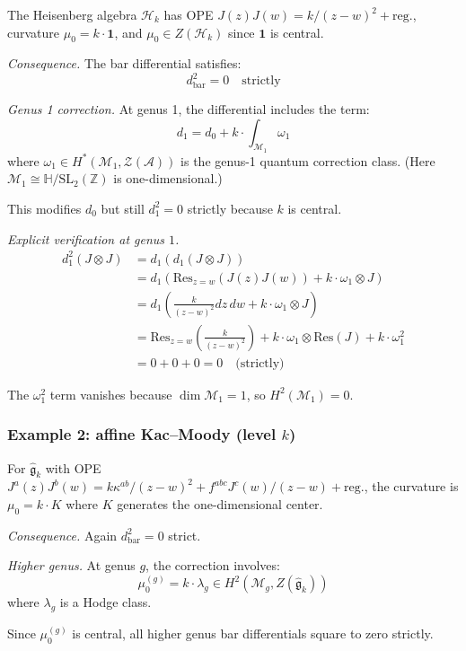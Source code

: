 \begin{example}\label{ex:heisenberg-strict}
The Heisenberg algebra $\mathcal{H}_k$ has OPE $J(z)J(w) = k/(z-w)^2 + \text{reg.}$, curvature $\mu_0 = k \cdot \mathbf{1}$, and $\mu_0 \in Z(\mathcal{H}_k)$ since $\mathbf{1}$ is central.

\emph{Consequence.} The bar differential satisfies:
\[d_{\text{bar}}^2 = 0 \quad \text{strictly}\]

\emph{Genus 1 correction.}
At genus 1, the differential includes the term:
\[d_1 = d_0 + k \cdot \int_{\mathcal{M}_1} \omega_1\]
where $\omega_1 \in H^*(\mathcal{M}_1, \mathcal{Z}(\mathcal{A}))$ is the genus-1 quantum correction class.  (Here $\mathcal{M}_1 \cong \mathbb{H}/\mathrm{SL}_2(\mathbb{Z})$ is one-dimensional.)

This modifies $d_0$ but still $d_1^2 = 0$ strictly because $k$ is central.

\emph{Explicit verification at genus $1$.}
\begin{align}
d_1^2(J \otimes J) &= d_1(d_1(J \otimes J)) \\
&= d_1\left(\text{Res}_{z=w}(J(z)J(w)) + k \cdot \omega_1 \otimes J\right) \\
&= d_1\left(\frac{k}{(z-w)^2} dz \, dw + k \cdot \omega_1 \otimes J\right) \\
&= \text{Res}_{z=w}\left(\frac{k}{(z-w)^2}\right) + k \cdot \omega_1 \otimes \text{Res}(J) 
+ k \cdot \omega_1^2 \\
&= 0 + 0 + 0 = 0 \quad \text{(strictly)}
\end{align}

The $\omega_1^2$ term vanishes because $\dim \mathcal{M}_1 = 1$, so $H^2(\mathcal{M}_1) = 0$.
\end{example}

\subsubsection{\texorpdfstring{Example 2: affine Kac--Moody (level $k$)}{Example 2: affine Kac--Moody (level k)}}

\begin{example}\label{ex:kac-moody-strict}
For $\widehat{\mathfrak{g}}_k$ with OPE $J^a(z)J^b(w) = k\kappa^{ab}/(z-w)^2 + f^{abc}J^c(w)/(z-w) + \text{reg.}$, the curvature is $\mu_0 = k \cdot K$ where $K$ generates the one-dimensional center.

\emph{Consequence.} Again $d_{\text{bar}}^2 = 0$ strict.

\emph{Higher genus.}
At genus $g$, the correction involves:
\[\mu_0^{(g)} = k \cdot \lambda_g \in H^2(\mathcal{M}_g, Z(\widehat{\mathfrak{g}}_k))\]
where $\lambda_g$ is a Hodge class.

Since $\mu_0^{(g)}$ is central, all higher genus bar differentials square to zero strictly.
\end{example}

